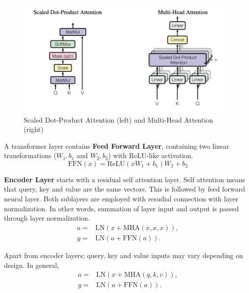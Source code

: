 \begin{figure}
	\centering
	\includegraphics[width=0.98\textwidth]{figures/ml_theory/att.png}
	\caption{Scaled Dot-Product Attention (left) and Multi-Head Attention (right)~\cite{vaswani_attention_2017}}
	\label{fig:att_and_mha}
\end{figure}

A transformer layer contains \textbf{Feed Forward Layer}, containing two linear transformations ($W_1, b_1$ and $W_2, b_2$) with ReLU-like activation.
\begin{equation}
\mathrm{FFN}(x) = \text{ReLU}(x W_1 + b_1) W_2 + b_2
\end{equation}

\textbf{Encoder Layer} starts with a residual self attention layer. 
Self attention means that query, key and value are the same vectors. 
This is followed by feed forward neural layer. 
Both sublayers are employed with resudial connection with layer normalization.
In other words, summation of layer input and output is passed through layer normalization. 
\begin{equation}
\begin{split}
a = & \mathrm{LN}(x + \mathrm{MHA}(x,x,x)), \\
y = & \mathrm{LN}(a + \mathrm{FFN}(a)).
\end{split}
\end{equation}

Apart from encoder layers; query, key and value inputs may vary depending on design. In general,
\begin{equation}
\begin{split}
a = & \mathrm{LN}(x + \mathrm{MHA}(q,k,v)), \\
y = & \mathrm{LN}(a + \mathrm{FFN}(a)).
\end{split}
\end{equation}


